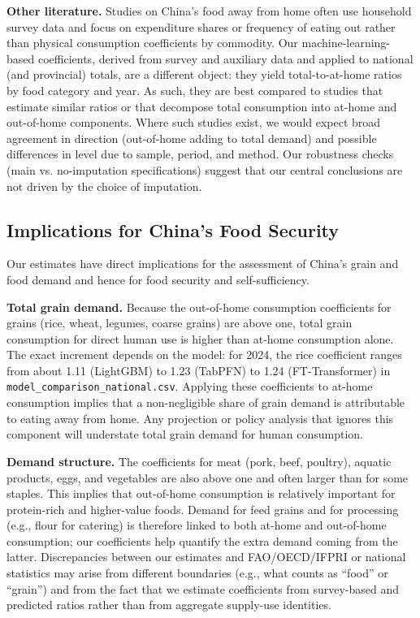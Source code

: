 \textbf{Other literature.} Studies on China's food away from home often use household survey data and focus on expenditure shares or frequency of eating out rather than physical consumption coefficients by commodity. Our machine-learning-based coefficients, derived from survey and auxiliary data and applied to national (and provincial) totals, are a different object: they yield total-to-at-home ratios by food category and year. As such, they are best compared to studies that estimate similar ratios or that decompose total consumption into at-home and out-of-home components. Where such studies exist, we would expect broad agreement in direction (out-of-home adding to total demand) and possible differences in level due to sample, period, and method. Our robustness checks (main vs. no-imputation specifications) suggest that our central conclusions are not driven by the choice of imputation.

\subsection{Implications for China's Food Security}

Our estimates have direct implications for the assessment of China's grain and food demand and hence for food security and self-sufficiency.

\textbf{Total grain demand.} Because the out-of-home consumption coefficients for grains (rice, wheat, legumes, coarse grains) are above one, total grain consumption for direct human use is higher than at-home consumption alone. The exact increment depends on the model: for 2024, the rice coefficient ranges from about 1.11 (LightGBM) to 1.23 (TabPFN) to 1.24 (FT-Transformer) in \texttt{model\_comparison\_national.csv}. Applying these coefficients to at-home consumption implies that a non-negligible share of grain demand is attributable to eating away from home. Any projection or policy analysis that ignores this component will understate total grain demand for human consumption.

\textbf{Demand structure.} The coefficients for meat (pork, beef, poultry), aquatic products, eggs, and vegetables are also above one and often larger than for some staples. This implies that out-of-home consumption is relatively important for protein-rich and higher-value foods. Demand for feed grains and for processing (e.g., flour for catering) is therefore linked to both at-home and out-of-home consumption; our coefficients help quantify the extra demand coming from the latter. Discrepancies between our estimates and FAO/OECD/IFPRI or national statistics may arise from different boundaries (e.g., what counts as “food” or “grain”) and from the fact that we estimate coefficients from survey-based and predicted ratios rather than from aggregate supply-use identities.

